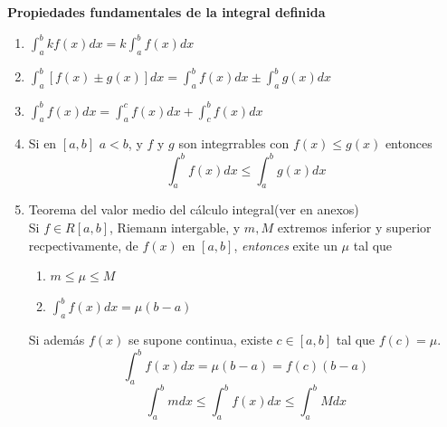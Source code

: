 \documentclass[10pt,twoside]{SelfArx} %
\begin{document}
\textbf{Propiedades fundamentales de la integral definida}\\
\begin{enumerate}
	\item $ \displaystyle\int_{a}^{b}kf(x)dx=k\int_{a}^{b}f(x)dx $
	\item $ \displaystyle\int_{a}^{b}[f(x)\pm g(x)]dx=\displaystyle\int_{a}^{b}f(x)dx\pm \displaystyle\int_{a}^{b}g(x)dx $
	\item $ \displaystyle\int_{a}^{b}f(x)dx=\displaystyle\int_{a}^{c}f(x)dx+\displaystyle\int_{c}^{b}f(x)dx $
	\item  Si en $ [a,b] $ $ a<b $, y $ f $ y $ g $ son integrrables con $ f(x)\leq g(x) $ entonces
	\[ \int_{a}^{b}f(x)dx\leq \int_{a}^{b}g(x)dx \]
	\item Teorema del valor medio del cálculo integral(ver en anexos) \\
	Si $ f\in R[a,b] $, Riemann intergable, y $ m,M $ extremos inferior y superior recpectivamente, de $ f(x) $ en $ [a,b] $,
	\textsl{entonces} exite un $ \mu $ tal que 
	\begin{enumerate}
		\item $ m\leq\mu\leq M $
		\item $ \int_{a}^{b}f(x)dx=\mu(b-a) $
	\end{enumerate}
	Si además $ f(x) $ se supone continua, existe $ c\in[a,b] $ tal que $ f(c)=\mu $.
\begin{equation}
	\int_{a}^{b}f(x)dx=\mu(b-a)=f(c)(b-a)
\end{equation}
	\begin{equation}
\int_{a}^{b}mdx\leq\int_{a}^{b}f(x)dx\leq\int_{a}^{b}Mdx
	\end{equation}
\end{enumerate}
\end{document}
